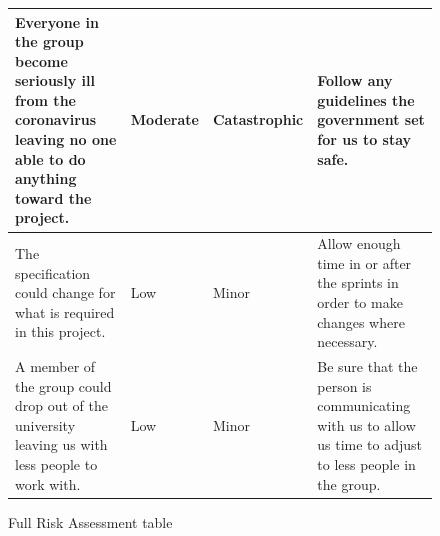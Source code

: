 \documentclass[10pt, notitlepage]{report}
\begin{document}
\begin{figure}[!h]
\begin{longtable}{| p{5.5cm} | p{2cm} | p{2cm} |  p{5.5cm} |}
Everyone in the group become seriously ill from the coronavirus leaving no one able to do anything toward the project.&
Moderate&
Catastrophic&
Follow any guidelines the government set for us to stay safe.\\
\hline

The specification could change for what is required in this project.& 
Low&
Minor&
Allow enough time in or after the sprints in order to make changes where necessary.\\
\hline

A member of the group could drop out of the university leaving us with less people to work with.& 
Low&
Minor&
Be sure that the person is communicating with us to allow us time to adjust to less people in the group.\\
\hline


\end{longtable}

\caption{Full Risk Assessment table}
\label{fig:risks}

\end{figure}

\newpage
\end{document}
